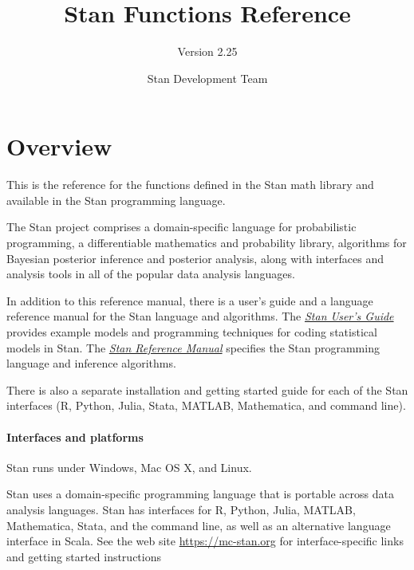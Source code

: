 \documentclass[
  10pt,
]{book}
\title{Stan Functions Reference}
\subtitle{Version 2.25}
\author{Stan Development Team}
\date{}
\begin{document}
\maketitle

{
\setcounter{tocdepth}{1}
\tableofcontents
}
\hypertarget{overview}{%
\chapter*{Overview}\label{overview}}

This is the reference for the functions defined in the Stan math
library and available in the Stan programming language.

The Stan project comprises a domain-specific language for
probabilistic programming, a differentiable mathematics and
probability library, algorithms for Bayesian posterior inference and
posterior analysis, along with interfaces and analysis tools in all of
the popular data analysis languages.

In addition to this reference manual, there is a user's guide and
a language reference manual for the Stan language and algorithms.
The \href{https://mc-stan.org/docs/stan-users-guide/index.html}{\emph{Stan User's Guide}}
provides example models and programming
techniques for coding statistical models in Stan.
The \href{https://mc-stan.org/docs/reference-manual/index.html}{\emph{Stan Reference Manual}}
specifies the Stan programming language
and inference algorithms.

There is also a separate installation and getting started guide for
each of the Stan interfaces (R, Python, Julia, Stata, MATLAB,
Mathematica, and command line).

\hypertarget{interfaces-and-platforms}{%
\subsubsection*{Interfaces and platforms}\label{interfaces-and-platforms}}

Stan runs under Windows, Mac OS X, and Linux.

Stan uses a domain-specific programming language that is portable
across data analysis languages. Stan has interfaces for R, Python,
Julia, MATLAB, Mathematica, Stata, and the command line, as well
as an alternative language interface in Scala. See the web site
\url{https://mc-stan.org} for interface-specific
links and getting started instructions
\end{document}
